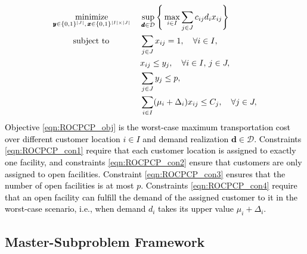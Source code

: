 \documentclass[preprint,review,11pt]{elsarticle}
\theoremstyle{definition}
\theoremstyle{remark}
\newcommand{\calD}{\mathcal{D}}
\newcommand{\xb}{\pmb{x}}
\newcommand{\yb}{\pmb{y}}
\newcommand{\db}{\pmb{d}}
\newcommand{\blue}{\textcolor{black}}
\begin{document}
\blue{
\begin{subequations}
\begin{align}
\underset{\yb\in\{0,1\}^{|J|},\,\xb\in\{0,1\}^{|I|\times|J|}}{\text{minimize}}\, \quad
& \sup_{\db\in\calD} \Bigg\{\max_{i\in I} \sum_{j\in J} c_{ij}d_i x_{ij} \Bigg\}\label{eqn:ROCPCP_obj}\\
\text{subject to} \hspace{13mm}
& \sum_{j\in J} x_{ij}=1,\quad\forall i\in I, \label{eqn:ROCPCP_con1}\\
& x_{ij}\leq y_j,\quad\forall i\in I,\, j\in J, \label{eqn:ROCPCP_con2}\\
& \sum_{j\in J} y_j \leq p, \label{eqn:ROCPCP_con3}\\
& \sum_{i\in I} (\mu_i+\Delta_i) x_{ij} \leq C_j ,\quad\forall j\in J, \label{eqn:ROCPCP_con4}
\end{align} \label{prob:ROCPCP}%
\end{subequations}
%
Objective \eqref{eqn:ROCPCP_obj} is the worst-case maximum transportation cost over different customer location $i\in I$ and demand realization $\db\in\calD$. Constraints \eqref{eqn:ROCPCP_con1} require that each customer location is assigned to exactly one facility, and constraints \eqref{eqn:ROCPCP_con2} ensure that customers are only assigned to open facilities. Constraint \eqref{eqn:ROCPCP_con3} ensures that the number of open facilities is at most $p$.  Constraints \eqref{eqn:ROCPCP_con4} require that an open facility can fulfill the demand of the assigned customer to it in the worst-case scenario, i.e., when demand $d_i$ takes its upper value $\mu_i+\Delta_i$.}


\subsection{Master-Subproblem Framework}  \label{appdx:ROCPC_MS_framework}
\end{document}
